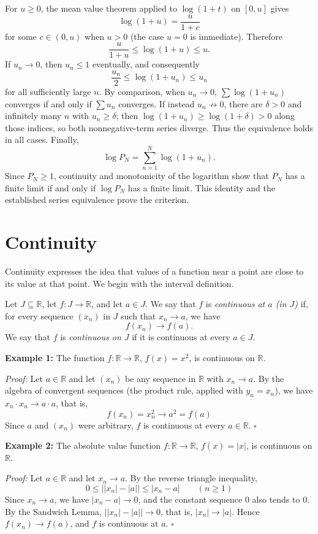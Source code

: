 \documentclass[a4paper,11pt,abstracton]{scrartcl}
\newcommand{\RR}{\mathbb{R}}
\theoremstyle{dotlessP}
\theoremstyle{dotlessS}
\theoremstyle{remark}
\theoremstyle{definition}
\begin{document}
For $u\ge0$, the mean value theorem applied to $\log(1+t)$ on
$[0,u]$ gives
\[
 \log(1+u)=\frac{u}{1+c}
\]
for some $c\in(0,u)$ when $u>0$ (the case $u=0$ is immediate).
Therefore
\[
 \frac{u}{1+u}\le\log(1+u)\le u.
\]
If $u_n\to0$, then
$u_n\le1$ eventually, and consequently
\[
 \frac{u_n}{2}\le\log(1+u_n)\le u_n
\]
for all sufficiently large $n$. By comparison, when $u_n\to0$,
$\sum\log(1+u_n)$ converges if and only if $\sum u_n$ converges.
If instead $u_n\not\to0$, there are $\delta>0$ and infinitely many
$n$ with $u_n\ge\delta$; then
$\log(1+u_n)\ge\log(1+\delta)>0$ along those indices, so both
nonnegative-term series diverge. Thus the equivalence holds in all
cases. Finally,
\[
 \log P_N=\sum_{n=1}^N\log(1+u_n).
\]
Since $P_N\ge1$, continuity and monotonicity of the logarithm show
that $P_N$ has a finite limit if and only if $\log P_N$ has a
finite limit. This identity and the established series equivalence
prove the criterion.

\section{Continuity}

Continuity expresses the idea that values of a function near a point are close to its value at that point. We begin with the interval definition.

\begin{definition_box}
Let $J\subseteq\RR$, let $f:J\to\RR$, and let $a\in J$. We say that $f$ is \emph{continuous at $a$ (in $J$)} if, for every sequence $(x_n)$ in $J$ such that $x_n\to a$, we have
\[
    f(x_n)\to f(a).
\]
We say that $f$ is \emph{continuous on $J$} if it is continuous at every $a\in J$.
\end{definition_box}

\begin{example_box}
\textbf{Example 1:} The function $f:\RR\to\RR$, $f(x)=x^2$, is continuous on $\RR$.

\textit{Proof:}
Let $a\in\RR$ and let $(x_n)$ be any sequence in $\RR$ with $x_n\to a$. By the algebra of convergent sequences (the product rule, applied with $y_n=x_n$), we have $x_n\cdot x_n\to a\cdot a$, that is,
\[
    f(x_n)=x_n^2\to a^2=f(a)
\]
Since $a$ and $(x_n)$ were arbitrary, $f$ is continuous at every $a\in\RR$.
\hfill$\square$
\end{example_box}

\begin{example_box}
\textbf{Example 2:} The absolute value function $f:\RR\to\RR$, $f(x)=|x|$, is continuous on $\RR$.

\textit{Proof:}
Let $a\in\RR$ and let $x_n\to a$. By the reverse triangle inequality,
\[
    0\le\bigl||x_n|-|a|\bigr|\le|x_n-a|\qquad(n\ge1)
\]
Since $x_n\to a$, we have $|x_n-a|\to0$, and the constant sequence $0$ also tends to $0$. By the Sandwich Lemma, $\bigl||x_n|-|a|\bigr|\to0$, that is, $|x_n|\to|a|$. Hence $f(x_n)\to f(a)$, and $f$ is continuous at $a$.
\hfill$\square$
\end{example_box}
\end{document}
